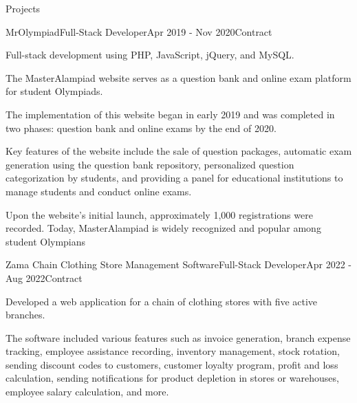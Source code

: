 \documentclass[]{kyvernitis-resume}
\begin{document}
\begin{section}{Projects}
    \begin{subsection}{MrOlympiad}{Full-Stack Developer}{Apr 2019 - Nov 2020}{Contract}
     		\item Full-stack development using PHP, JavaScript, jQuery, and MySQL.
		\item	The MasterAlampiad website serves as a question bank and online exam platform for student Olympiads.
		\item	The implementation of this website began in early 2019 and was completed in two phases: question bank and online exams by the end of 2020.
		\item	Key features of the website include the sale of question packages, automatic exam generation using the question bank repository, personalized question categorization by students, and providing a panel for educational institutions to manage students and conduct online exams.
		\item	Upon the website's initial launch, approximately 1,000 registrations were recorded. Today, MasterAlampiad is widely recognized and popular among student Olympians

    \end{subsection}
    \begin{subsection}{Zama Chain Clothing Store Management Software}{Full-Stack Developer}{Apr 2022 - Aug 2022}{Contract}
     		\item Developed a web application for a chain of clothing stores with five active branches.
		\item The software included various features such as invoice generation, branch expense tracking, employee assistance recording, inventory management, stock rotation, sending discount codes to customers, customer loyalty program, profit and loss calculation, sending notifications for product depletion in stores or warehouses, employee salary calculation, and more.

    \end{subsection}


    
\end{section}





\end{document}
